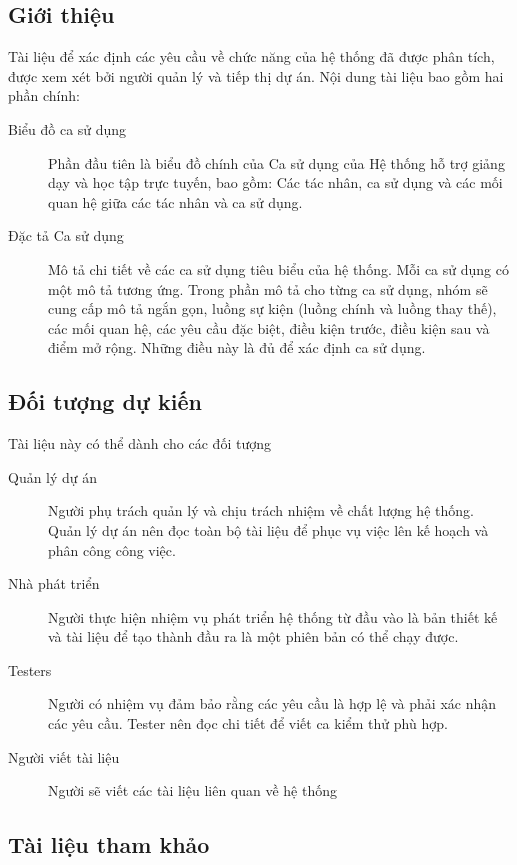\documentclass[./../main_file.tex]{subfiles}
\begin{document}
	\subsection{Giới thiệu}
	Tài liệu để xác định các yêu cầu về chức năng của hệ thống đã được phân tích, được xem xét bởi người quản lý và tiếp thị dự án.
	Nội dung tài liệu bao gồm hai phần chính:
	\begin{description}
\item[Biểu đồ ca sử dụng] Phần đầu tiên là biểu đồ chính của Ca sử dụng của Hệ thống hỗ trợ giảng dạy và học tập trực tuyến, bao gồm: Các tác nhân, ca sử dụng và các mối quan hệ giữa các tác nhân và ca sử dụng.
		\item [Đặc tả Ca sử dụng] Mô tả chi tiết về các ca sử dụng tiêu biểu của hệ thống. Mỗi ca sử dụng có một mô tả tương ứng. Trong phần mô tả cho từng ca sử dụng, nhóm sẽ cung cấp mô tả ngắn gọn, luồng sự kiện (luồng chính và luồng thay thế), các mối quan hệ, các yêu cầu đặc biệt, điều kiện trước, điều kiện sau và điểm mở rộng. Những điều này là đủ để xác định ca sử dụng.
	\end{description}
	\subsection{Đối tượng dự kiến}
	Tài liệu này có thể dành cho các đối tượng
	\begin{description}
		\item [Quản lý dự án] Người phụ trách quản lý và chịu trách nhiệm về chất lượng hệ thống. Quản lý dự án nên đọc toàn bộ tài liệu để phục vụ việc lên kế hoạch và phân công công việc.
		\item [Nhà phát triển] Người thực hiện nhiệm vụ phát triển hệ thống từ đầu vào là bản thiết kế và tài liệu để tạo thành đầu ra là một phiên bản có thể chạy được.
		\item [Testers] Người có nhiệm vụ đảm bảo rằng các yêu cầu là hợp lệ và phải xác nhận các yêu cầu. Tester nên đọc chi tiết để viết ca kiểm thử phù hợp.
		\item [Người viết tài liệu] Người sẽ viết các tài liệu liên quan về hệ thống
	\end{description}
	\subsection{Tài liệu tham khảo}
	\nocite{*}
	\printbibliography[heading=none]
	
\end{document}
